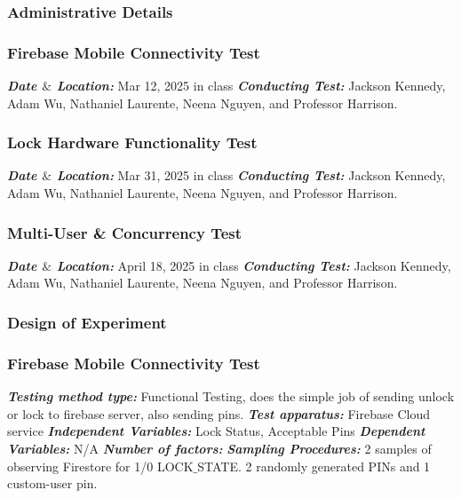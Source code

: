 \subsubsection{Administrative Details}

\subsubsection{Firebase Mobile Connectivity Test}
\textbf{\textit{Date $\&$ Location:}} Mar 12, 2025 in class
\newline
\textbf{\textit{Conducting Test:}} Jackson Kennedy, Adam Wu, Nathaniel Laurente, Neena Nguyen, and Professor Harrison.

\subsubsection{Lock Hardware Functionality Test}
\textbf{\textit{Date $\&$ Location:}} Mar 31, 2025 in class
\newline
\textbf{\textit{Conducting Test:}} Jackson Kennedy, Adam Wu, Nathaniel Laurente, Neena Nguyen, and Professor Harrison.

\subsubsection{Multi-User \& Concurrency Test}
\textbf{\textit{Date $\&$ Location:}} April 18, 2025 in class
\newline
\textbf{\textit{Conducting Test:}} Jackson Kennedy, Adam Wu, Nathaniel Laurente, Neena Nguyen, and Professor Harrison.

\subsubsection{Design of Experiment}
\subsubsection{Firebase Mobile Connectivity Test}
\textbf{\textit{Testing method type:}} Functional Testing, does the simple job of sending unlock or lock to firebase server, also sending pins.
\newline
\textbf{\textit{Test apparatus:}} Firebase Cloud service
\newline
\textbf{\textit{Independent Variables:}} Lock Status, Acceptable Pins
\newline
\textbf{\textit{Dependent Variables:}} N/A
\newline
\textbf{\textit{Number of factors:}}
\newline
\textbf{\textit{Sampling Procedures:}} 2 samples of observing Firestore for 1/0 LOCK$\_$STATE. 2 randomly generated PINs and 1 custom-user pin.

